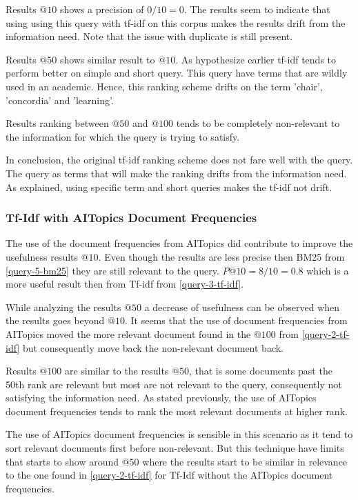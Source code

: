 \par Results $@10$ shows a precision of $0/10=0$. The results seem to indicate that using using this query with tf-idf on this corpus makes the results drift from the information need. Note that the issue with duplicate is still present.
\par Results $@50$ shows similar result to $@10$. As hypothesize earlier tf-idf tends to perform better on simple and short query. This query have terms that are wildly used in an academic. Hence, this ranking scheme drifts on the term 'chair', 'concordia' and 'learning'.
\par Results ranking between $@50$ and $@100$ tends to be completely non-relevant to the information for which the query is trying to satisfy.
\par In conclusion, the original tf-idf ranking scheme does not fare well with the query. The query as terms that will make the ranking drifts from the information need. As explained, using specific term and short queries makes the tf-idf not drift.

\subsubsection{Tf-Idf with AITopics Document Frequencies} \label{query-6-tf-idf-aitopics}

\par The use of the document frequencies from AITopics did contribute to improve the usefulness results $@10$. Even though the results are less precise then BM25 from \ref{query-5-bm25} they are still relevant to the query. $P@10=8/10=0.8$ which is a more useful result then from Tf-idf from \ref{query-3-tf-idf}.
\par While analyzing the results $@50$ a decrease of usefulness can be observed when the results goes beyond $@10$. It seems that the use of document frequencies from AITopics moved the more relevant document found in the $@100$ from \ref{query-2-tf-idf} but consequently move back the non-relevant document back.
\par Results $@100$ are similar to the results $@50$, that is some documents past the 50th rank are relevant but most are not relevant to the query, consequently not satisfying the information need. As stated previously, the use of AITopics document frequencies tends to rank the most relevant documents at higher rank.
\par The use of AITopics document frequencies is sensible in this scenario as it tend to sort relevant documents first before non-relevant. But this technique have limits that starts to show around $@50$ where the results start to be similar in relevance to the one found in \ref{query-2-tf-idf} for Tf-Idf without the AITopics document frequencies.

